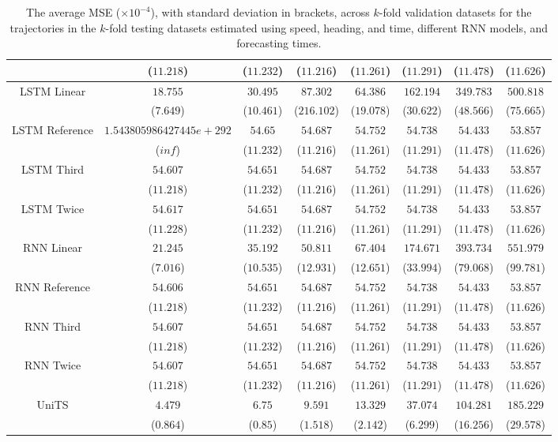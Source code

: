 \begin{table}[!ht]
{\begin{tabular}{|c|c|c|c|c|c|c|c|}
			 & ($11.218$) & ($11.232$) & ($11.216$) & ($11.261$) & ($11.291$) & ($11.478$) & ($11.626$) \\ \hline
			\multirow{2}{*}{LSTM Linear} & $18.755$ & $30.495$ & $87.302$ & $64.386$ & $162.194$ & $349.783$ & $500.818$ \\
			 & ($7.649$) & ($10.461$) & ($216.102$) & ($19.078$) & ($30.622$) & ($48.566$) & ($75.665$) \\ \hline
			\multirow{2}{*}{LSTM Reference} & $1.543805986427445e+292$ & $54.65$ & $54.687$ & $54.752$ & $54.738$ & $54.433$ & $53.857$ \\
			 & ($inf$) & ($11.232$) & ($11.216$) & ($11.261$) & ($11.291$) & ($11.478$) & ($11.626$) \\ \hline
			\multirow{2}{*}{LSTM Third} & $54.607$ & $54.651$ & $54.687$ & $54.752$ & $54.738$ & $54.433$ & $53.857$ \\
			 & ($11.218$) & ($11.232$) & ($11.216$) & ($11.261$) & ($11.291$) & ($11.478$) & ($11.626$) \\ \hline
			\multirow{2}{*}{LSTM Twice} & $54.617$ & $54.651$ & $54.687$ & $54.752$ & $54.738$ & $54.433$ & $53.857$ \\
			 & ($11.228$) & ($11.232$) & ($11.216$) & ($11.261$) & ($11.291$) & ($11.478$) & ($11.626$) \\ \hline
			\multirow{2}{*}{RNN Linear} & $21.245$ & $35.192$ & $50.811$ & $67.404$ & $174.671$ & $393.734$ & $551.979$ \\
			 & ($7.016$) & ($10.535$) & ($12.931$) & ($12.651$) & ($33.994$) & ($79.068$) & ($99.781$) \\ \hline
			\multirow{2}{*}{RNN Reference} & $54.606$ & $54.651$ & $54.687$ & $54.752$ & $54.738$ & $54.433$ & $53.857$ \\
			 & ($11.218$) & ($11.232$) & ($11.216$) & ($11.261$) & ($11.291$) & ($11.478$) & ($11.626$) \\ \hline
			\multirow{2}{*}{RNN Third} & $54.607$ & $54.651$ & $54.687$ & $54.752$ & $54.738$ & $54.433$ & $53.857$ \\
			 & ($11.218$) & ($11.232$) & ($11.216$) & ($11.261$) & ($11.291$) & ($11.478$) & ($11.626$) \\ \hline
			\multirow{2}{*}{RNN Twice} & $54.607$ & $54.651$ & $54.687$ & $54.752$ & $54.738$ & $54.433$ & $53.857$ \\
			 & ($11.218$) & ($11.232$) & ($11.216$) & ($11.261$) & ($11.291$) & ($11.478$) & ($11.626$) \\ \hline
			\multirow{2}{*}{UniTS} & $4.479$ & $6.75$ & $9.591$ & $13.329$ & $37.074$ & $104.281$ & $185.229$ \\
			 & ($0.864$) & ($0.85$) & ($1.518$) & ($2.142$) & ($6.299$) & ($16.256$) & ($29.578$) \\ \hline
		\end{tabular}
	}
	\caption{The average MSE ($\times 10^{-4}$), with standard deviation in brackets, across $k$-fold validation datasets for the trajectories in the $k$-fold testing datasets estimated using speed, heading, and time, different RNN models, and forecasting times.}
	\label{tab:all_speed_actual_dir_MSE}
\end{table}